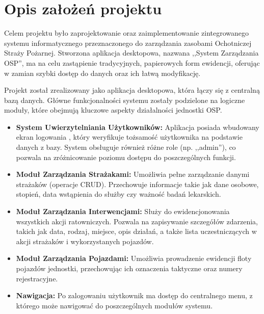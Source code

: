 \chapter{Opis założeń projektu}
\label{chap:zalozenia}

Celem projektu było zaprojektowanie oraz zaimplementowanie zintegrowanego systemu informatycznego przeznaczonego do zarządzania zasobami Ochotniczej Straży Pożarnej. Stworzona aplikacja desktopowa, nazwana ,,System Zarządzania OSP'', ma na celu zastąpienie tradycyjnych, papierowych form ewidencji, oferując w zamian szybki dostęp do danych oraz ich łatwą modyfikację.

Projekt został zrealizowany jako aplikacja desktopowa, która łączy się z centralną bazą danych. Główne funkcjonalności systemu zostały podzielone na logiczne moduły, które obejmują kluczowe aspekty działalności jednostki OSP.

\begin{itemize}
    \item \textbf{System Uwierzytelniania Użytkowników:} Aplikacja posiada wbudowany ekran logowania , który weryfikuje tożsamość użytkownika na podstawie danych z bazy. System obsługuje również różne role (np. ,,admin''), co pozwala na zróżnicowanie poziomu dostępu do poszczególnych funkcji.
    \item \textbf{Moduł Zarządzania Strażakami:} Umożliwia pełne zarządzanie danymi strażaków (operacje CRUD). Przechowuje informacje takie jak dane osobowe, stopień, data wstąpienia do służby czy ważność badań lekarskich.
    \item \textbf{Moduł Zarządzania Interwencjami:} Służy do ewidencjonowania wszystkich akcji ratowniczych. Pozwala na zapisywanie szczegółów zdarzenia, takich jak data, rodzaj, miejsce, opis działań, a także lista uczestniczących w akcji strażaków i wykorzystanych pojazdów.
    \item \textbf{Moduł Zarządzania Pojazdami:} Umożliwia prowadzenie ewidencji floty pojazdów jednostki, przechowując ich oznaczenia taktyczne oraz numery rejestracyjne.
    \item \textbf{Nawigacja:} Po zalogowaniu użytkownik ma dostęp do centralnego menu, z którego może nawigować do poszczególnych modułów systemu.
\end{itemize}

